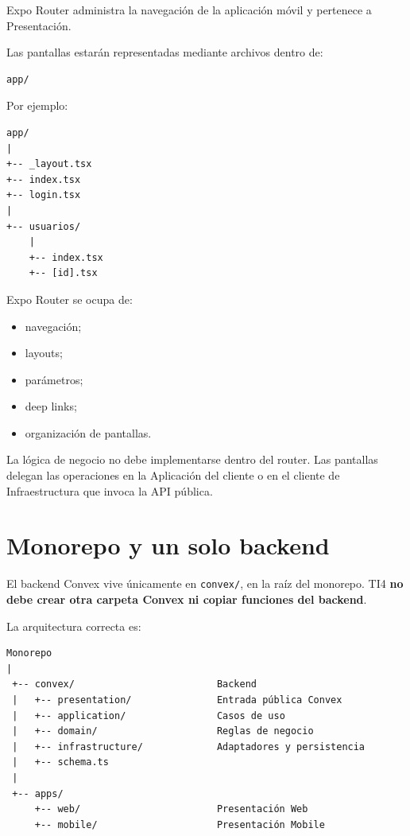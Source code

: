 \documentclass[11pt,a4paper]{article}
\begin{document}
Expo Router administra la navegación de la aplicación móvil y pertenece a
Presentación.

Las pantallas estarán representadas mediante archivos dentro de:

\begin{lstlisting}
app/
\end{lstlisting}

Por ejemplo:

\begin{lstlisting}
app/
|
+-- _layout.tsx
+-- index.tsx
+-- login.tsx
|
+-- usuarios/
    |
    +-- index.tsx
    +-- [id].tsx
\end{lstlisting}

Expo Router se ocupa de:

\begin{itemize}
  \item navegación;
  \item layouts;
  \item parámetros;
  \item deep links;
  \item organización de pantallas.
\end{itemize}

La lógica de negocio no debe implementarse dentro del router. Las pantallas
delegan las operaciones en la Aplicación del cliente o en el cliente de
Infraestructura que invoca la API pública.

\section{Monorepo y un solo backend}

El backend Convex vive únicamente en \texttt{convex/}, en la raíz del monorepo.
TI4 \textbf{no debe crear otra carpeta Convex ni copiar funciones del backend}.

La arquitectura correcta es:

\begin{lstlisting}
Monorepo
|
 +-- convex/                         Backend
 |   +-- presentation/               Entrada pública Convex
 |   +-- application/                Casos de uso
 |   +-- domain/                     Reglas de negocio
 |   +-- infrastructure/             Adaptadores y persistencia
 |   +-- schema.ts
 |
 +-- apps/
     +-- web/                        Presentación Web
     +-- mobile/                     Presentación Mobile
\end{lstlisting}
\end{document}
